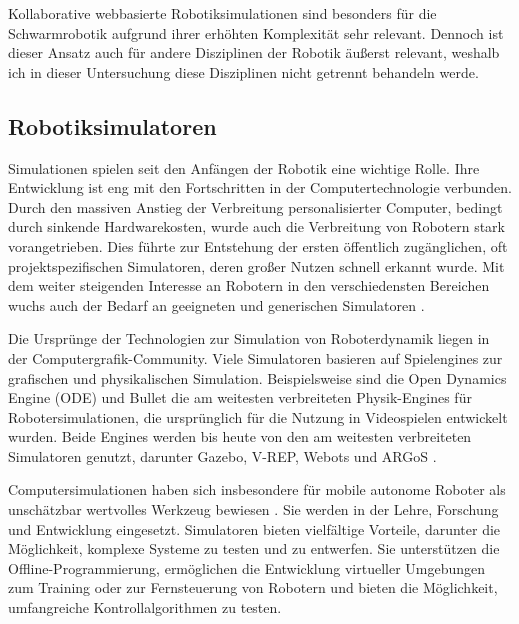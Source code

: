 \documentclass[german,version-2020-11]{uzl-thesis}
\begin{document}
Kollaborative webbasierte Robotiksimulationen sind besonders für die Schwarmrobotik aufgrund ihrer erhöhten Komplexität sehr relevant. 
Dennoch ist dieser Ansatz auch für andere Disziplinen der Robotik äußerst relevant, weshalb ich in dieser Untersuchung diese Disziplinen nicht getrennt behandeln werde.

\subsection{Robotiksimulatoren}
Simulationen spielen seit den Anfängen der Robotik eine wichtige Rolle. 
Ihre Entwicklung ist eng mit den Fortschritten in der Computertechnologie verbunden. 
Durch den massiven Anstieg der Verbreitung personalisierter Computer, bedingt durch sinkende Hardwarekosten, wurde auch die Verbreitung von Robotern stark vorangetrieben. 
Dies führte zur Entstehung der ersten öffentlich zugänglichen, oft projektspezifischen Simulatoren, deren großer Nutzen schnell erkannt wurde.
Mit dem weiter steigenden Interesse an Robotern in den verschiedensten Bereichen wuchs auch der Bedarf an geeigneten und generischen Simulatoren \cite{Castillo2010}. 

Die Ursprünge der Technologien zur Simulation von Roboterdynamik liegen in der Computergrafik-Community. 
Viele Simulatoren basieren auf Spielengines zur grafischen und physikalischen Simulation.
Beispielsweise sind die Open Dynamics Engine (ODE) und Bullet die am weitesten verbreiteten Physik-Engines für Robotersimulationen, die ursprünglich für die Nutzung in Videospielen entwickelt wurden. 
Beide Engines werden bis heute von den am weitesten verbreiteten Simulatoren genutzt, darunter Gazebo, V-REP, Webots und ARGoS \cite{Ivaldi2015}. 

Computersimulationen haben sich insbesondere für mobile autonome Roboter als unschätzbar wertvolles Werkzeug bewiesen \cite{Haber2012}. 
Sie werden in der Lehre, Forschung und Entwicklung eingesetzt. 
Simulatoren bieten vielfältige Vorteile, darunter die Möglichkeit, komplexe Systeme zu testen und zu entwerfen. 
Sie unterstützen die Offline-Programmierung, ermöglichen die Entwicklung virtueller Umgebungen zum Training oder 
zur Fernsteuerung von Robotern und bieten die Möglichkeit, umfangreiche Kontrollalgorithmen zu testen.
\end{document}

